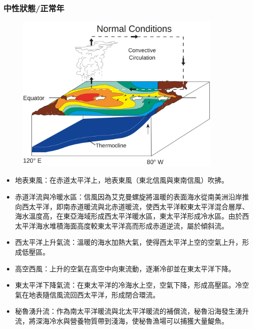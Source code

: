 \documentclass[a4paper,12pt]{report}
\begin{document}
\begin{itemize}
\subsubsection{中性狀態/正常年}
\bct\begin{figure}[H]
    \centering
    \includegraphics[width=0.9\textwidth]{normal.png}
\end{figure}\FB\ect
\begin{itemize}
  \item 地表東風：在赤道太平洋上，地表東風（東北信風與東南信風）吹拂。
  \item 赤道洋流與冷暖水區：信風因為艾克曼螺旋將溫暖的表面海水從南美洲沿岸推向西太平洋，即南赤道暖流與北赤道暖流，使西太平洋較東太平洋混合層厚、海水溫度高，在東亞海域形成西太平洋暖水區，東太平洋形成冷水區。由於西太平洋海水堆積海面高度較東太平洋高而形成赤道逆流，屬於傾斜流。
  \item 西太平洋上升氣流：溫暖的海水加熱大氣，使得西太平洋上空的空氣上升，形成低壓區。
  \item 高空西風：上升的空氣在高空中向東流動，逐漸冷卻並在東太平洋下降。
  \item 東太平洋下降氣流：在東太平洋的冷海水上空，空氣下降，形成高壓區。冷空氣在地表隨信風流回西太平洋，形成閉合環流。
  \item 秘魯湧升流：作為南太平洋暖流與北太平洋暖流的補償流，秘魯沿海發生湧升流，將深海冷水與營養物質帶到淺海，使秘魯漁場可以捕獲大量鯷魚。
\end{itemize}

\end{itemize}
\end{document}
